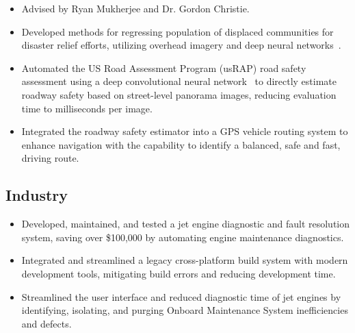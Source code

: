 \documentclass[11pt,a4paper,sans]{moderncv} %
\begin{document}
{
\begin{itemize} 
	\item Advised by Ryan Mukherjee and Dr. Gordon Christie.
	\item Developed methods for regressing population of displaced communities for disaster relief efforts, utilizing overhead imagery and deep neural networks~\cite{DCApaper}.
\end{itemize}
}
{
\begin{itemize} 
	\item Automated the US Road Assessment Program (usRAP) road safety assessment using a deep convolutional neural network~\cite{WACVpaper} to directly estimate roadway safety based on street-level panorama images, reducing evaluation time to milliseconds per image.
	\item Integrated the roadway safety estimator into a GPS vehicle routing system to enhance navigation with the capability to identify a balanced, safe and fast, driving route.
\end{itemize}
}


\subsection{Industry}

{
	\begin{itemize}
		\item Developed, maintained, and tested a jet engine diagnostic and fault resolution system, saving over \$100,000 by automating engine maintenance diagnostics.
		\item Integrated and streamlined a legacy cross-platform build system with modern development tools, mitigating build errors and reducing development time.
	\end{itemize}
}


{
\begin{itemize}
	\item Streamlined the user interface and reduced diagnostic time of jet engines by identifying, isolating, and purging Onboard Maintenance System inefficiencies and defects.
\end{itemize}
}
\end{document}
